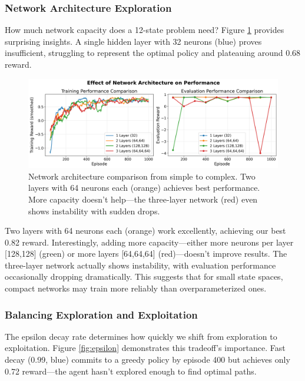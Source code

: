 \documentclass[conference]{IEEEtran}
\begin{document}
\subsubsection{Network Architecture Exploration}

How much network capacity does a 12-state problem need? Figure \ref{fig:arch} provides surprising insights. A single hidden layer with 32 neurons (blue) proves insufficient, struggling to represent the optimal policy and plateauing around 0.68 reward.

\begin{figure}[htbp]
\centerline{\includegraphics[width=\columnwidth]{images/experiment_architecture.png}}
\caption{Network architecture comparison from simple to complex. Two layers with 64 neurons each (orange) achieves best performance. More capacity doesn't help—the three-layer network (red) even shows instability with sudden drops.}
\label{fig:arch}
\end{figure}

Two layers with 64 neurons each (orange) work excellently, achieving our best 0.82 reward. Interestingly, adding more capacity—either more neurons per layer [128,128] (green) or more layers [64,64,64] (red)—doesn't improve results. The three-layer network actually shows instability, with evaluation performance occasionally dropping dramatically. This suggests that for small state spaces, compact networks may train more reliably than overparameterized ones.

\subsubsection{Balancing Exploration and Exploitation}

The epsilon decay rate determines how quickly we shift from exploration to exploitation. Figure \ref{fig:epsilon} demonstrates this tradeoff's importance. Fast decay (0.99, blue) commits to a greedy policy by episode 400 but achieves only 0.72 reward—the agent hasn't explored enough to find optimal paths.
\end{document}
